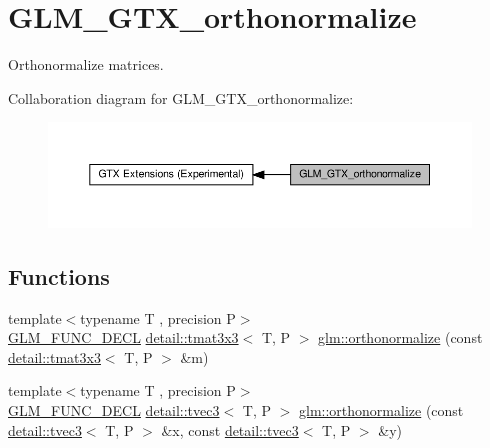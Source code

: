 \hypertarget{group__gtx__orthonormalize}{}\section{G\+L\+M\+\_\+\+G\+T\+X\+\_\+orthonormalize}
\label{group__gtx__orthonormalize}


Orthonormalize matrices.  


Collaboration diagram for G\+L\+M\+\_\+\+G\+T\+X\+\_\+orthonormalize\+:\nopagebreak
\begin{figure}[H]
\begin{center}
\leavevmode
\includegraphics[width=350pt]{group__gtx__orthonormalize}
\end{center}
\end{figure}
\subsection*{Functions}
\begin{DoxyCompactItemize}
\item 
{\footnotesize template$<$typename T , precision P$>$ }\\\hyperlink{setup_8hpp_ab2d052de21a70539923e9bcbf6e83a51}{G\+L\+M\+\_\+\+F\+U\+N\+C\+\_\+\+D\+E\+CL} \hyperlink{structglm_1_1detail_1_1tmat3x3}{detail\+::tmat3x3}$<$ T, P $>$ \hyperlink{group__gtx__orthonormalize_ga2d615d8b740d7d11e583651c34103e40}{glm\+::orthonormalize} (const \hyperlink{structglm_1_1detail_1_1tmat3x3}{detail\+::tmat3x3}$<$ T, P $>$ \&m)
\item 
{\footnotesize template$<$typename T , precision P$>$ }\\\hyperlink{setup_8hpp_ab2d052de21a70539923e9bcbf6e83a51}{G\+L\+M\+\_\+\+F\+U\+N\+C\+\_\+\+D\+E\+CL} \hyperlink{structglm_1_1detail_1_1tvec3}{detail\+::tvec3}$<$ T, P $>$ \hyperlink{group__gtx__orthonormalize_ga41d176cb31fda91b672655c839084b43}{glm\+::orthonormalize} (const \hyperlink{structglm_1_1detail_1_1tvec3}{detail\+::tvec3}$<$ T, P $>$ \&x, const \hyperlink{structglm_1_1detail_1_1tvec3}{detail\+::tvec3}$<$ T, P $>$ \&y)
\end{DoxyCompactItemize}


